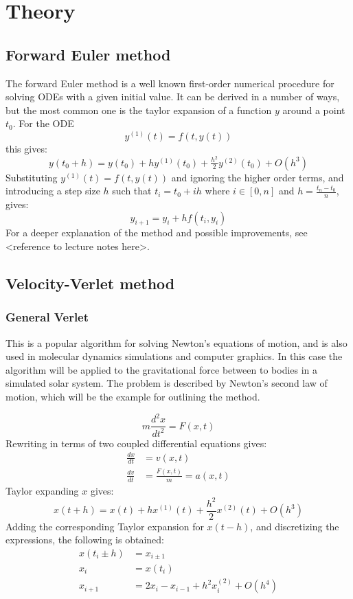 \section{Theory}
\subsection{Forward Euler method}
The forward Euler method is a well known first-order numerical procedure for solving ODEs with a 
given initial value. It can be derived in a number of ways, but the most common one is the 
taylor expansion of a function $y$ around a point $t_0$. For the ODE 
$$y^{(1)}(t) = f(t,y(t))$$ this gives:
\begin{equation*}
y(t_0 + h) =  y(t_0) + hy^{(1)}(t_0) + \tfrac{h^2}{2}y^{(2)}(t_0) + O(h^3)
\end{equation*}
Substituting $y^{(1)}(t) = f(t,y(t))$ and ignoring the higher order terms, and introducing a step size
$h$ such that $t_i = t_0 + ih$ where $i \in [0,n]$ and $h = \frac{t_n-t_0}{n}$, gives:
\begin{equation*} 
y_{i+1} = y_i + hf(t_i, y_i)
\end{equation*}
For a deeper explanation of the method and possible improvements, see <reference to 
lecture notes here>.

\subsection{Velocity-Verlet method}
\subsubsection{General Verlet}
This is a popular algorithm for solving Newton's equations of motion, and is also used in  
molecular dynamics simulations and computer graphics. In this case the algorithm will be  
applied to the gravitational force between to bodies in a simulated solar system. 
The problem is described by Newton's second law of motion, which will be the example for outlining
the method.

\begin{equation*}
m\frac{d^2x}{dt^2}= F(x,t)
\end{equation*}
Rewriting in terms of two coupled differential equations gives:
\begin{align*}
\frac{dx}{dt} &= v(x,t) \\
\frac{dv}{dt} &= \frac{F(x,t)}{m} = a(x,t)
\end{align*}
Taylor expanding $x$ gives:
\begin{equation*}
x(t+h) = x(t) + hx^{(1)}(t) + \frac{h^2}{2}x^{{(2)}}(t) + O(h^3)
\end{equation*}
Adding the corresponding Taylor expansion for $x(t-h)$, and discretizing the expressions,
the following is obtained:
\begin{align*}
x(t_i \pm h) &= x_{i\pm 1} \\
x_i &= x(t_i) \\
x_{i+1} &= 2x_i - x_{i-1} + h^2 x_i^{{(2)}} + O(h^4)
\end{align*}
